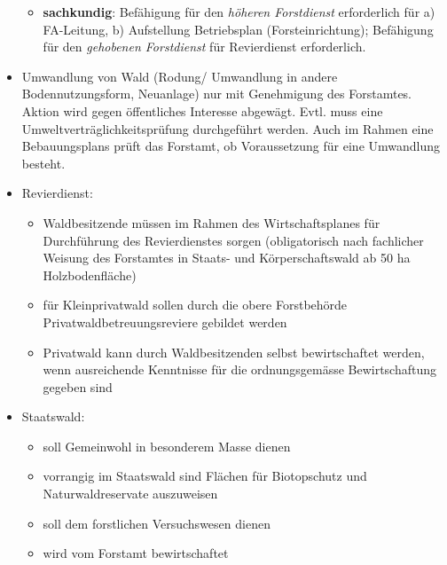 \documentclass{article}
\begin{document}
\begin{itemize}
\begin{itemize}
			\item \textbf{sachkundig}: Befähigung für den \textit{höheren Forstdienst} erforderlich für a) FA-Leitung, b) Aufstellung Betriebsplan (Forsteinrichtung); Befähigung für den \textit{gehobenen Forstdienst} für Revierdienst erforderlich.
			
		\end{itemize}
	
	
	\item Umwandlung von Wald (Rodung/ Umwandlung in andere Bodennutzungsform, Neuanlage) nur mit Genehmigung des Forstamtes. Aktion wird gegen öffentliches Interesse abgewägt. Evtl. muss eine  Umweltverträglichkeitsprüfung durchgeführt werden. Auch im Rahmen eine Bebauungsplans prüft das Forstamt, ob Voraussetzung für eine Umwandlung besteht. 


   \item Revierdienst: 

      \begin{itemize} 

          \item Waldbesitzende müssen im Rahmen des Wirtschaftsplanes für Durchführung des Revierdienstes sorgen (obligatorisch nach fachlicher Weisung des Forstamtes in Staats- und Körperschaftswald ab 50 ha Holzbodenfläche)
          
          \item für Kleinprivatwald sollen durch die obere Forstbehörde Privatwaldbetreuungsreviere gebildet werden
          
          \item Privatwald kann durch Waldbesitzenden selbst bewirtschaftet werden, wenn ausreichende Kenntnisse für die ordnungsgemässe Bewirtschaftung gegeben sind

      \end{itemize}


   \item Staatswald: 

      \begin{itemize} 
	
	    \item soll Gemeinwohl in besonderem Masse dienen
	 
	    \item vorrangig im Staatswald sind Flächen für Biotopschutz und Naturwaldreservate auszuweisen
	
	    \item soll dem forstlichen Versuchswesen dienen
	    
	    \item wird vom Forstamt bewirtschaftet
	

\end{itemize}
\end{itemize}
\end{document}
